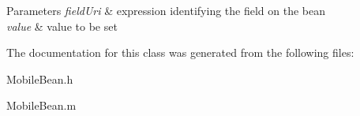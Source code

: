 \begin{DoxyParams}{\-Parameters}
{\em field\-Uri} & expression identifying the field on the bean \\
\hline
{\em value} & value to be set \\
\hline
\end{DoxyParams}


\-The documentation for this class was generated from the following files\-:\begin{DoxyCompactItemize}
\item 
\-Mobile\-Bean.\-h\item 
\-Mobile\-Bean.\-m\end{DoxyCompactItemize}
